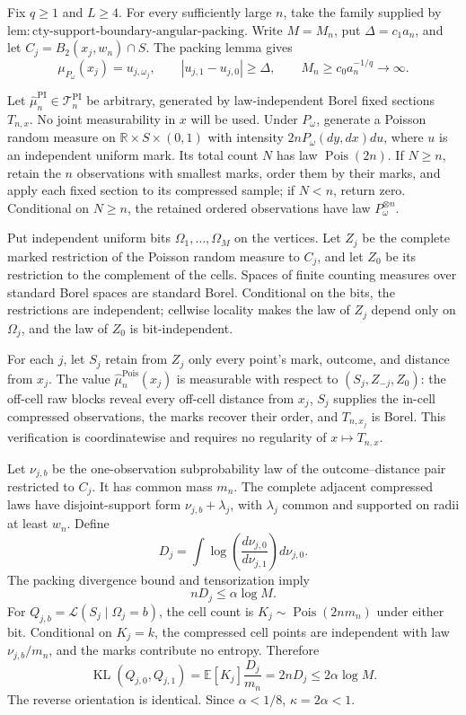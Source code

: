 Fix \(q\geq1\) and \(L\geq4\).  For every sufficiently large \(n\), take the family supplied by \(\mathrm{lem:cty\text{-}support\text{-}boundary\text{-}angular\text{-}packing}\).  Write \(M=M_n\), put \(\Delta=c_1a_n\), and let \(C_j=B_2(x_j,w_n)\cap S\).  The packing lemma gives
\[
 \mu_{P_\omega}(x_j)=u_{j,\omega_j},
 \qquad |u_{j,1}-u_{j,0}|\geq\Delta,
 \qquad M_n\geq c_0a_n^{-1/q}\longrightarrow\infty.
\]

Let \(\widehat\mu_n^{\mathrm{PI}}\in\mathcal T_n^{\mathrm{PI}}\) be arbitrary, generated by law-independent Borel fixed sections \(T_{n,x}\).  No joint measurability in \(x\) will be used.  Under \(P_\omega\), generate a Poisson random measure on \(\mathbb R\times S\times(0,1)\) with intensity \(2nP_\omega(dy,dx)du\), where \(u\) is an independent uniform mark.  Its total count \(N\) has law \(\operatorname{Pois}(2n)\).  If \(N\geq n\), retain the \(n\) observations with smallest marks, order them by their marks, and apply each fixed section to its compressed sample; if \(N<n\), return zero.  Conditional on \(N\geq n\), the retained ordered observations have law \(P_\omega^{\otimes n}\).

Put independent uniform bits \(\Omega_1,\ldots,\Omega_M\) on the vertices.  Let \(Z_j\) be the complete marked restriction of the Poisson random measure to \(C_j\), and let \(Z_0\) be its restriction to the complement of the cells.  Spaces of finite counting measures over standard Borel spaces are standard Borel.  Conditional on the bits, the restrictions are independent; cellwise locality makes the law of \(Z_j\) depend only on \(\Omega_j\), and the law of \(Z_0\) is bit-independent.

For each \(j\), let \(S_j\) retain from \(Z_j\) only every point's mark, outcome, and distance from \(x_j\).  The value \(\widehat\mu_n^{\mathrm{Pois}}(x_j)\) is measurable with respect to \((S_j,Z_{-j},Z_0)\): the off-cell raw blocks reveal every off-cell distance from \(x_j\), \(S_j\) supplies the in-cell compressed observations, the marks recover their order, and \(T_{n,x_j}\) is Borel.  This verification is coordinatewise and requires no regularity of \(x\mapsto T_{n,x}\).

Let \(\nu_{j,b}\) be the one-observation subprobability law of the outcome--distance pair restricted to \(C_j\).  It has common mass \(m_n\).  The complete adjacent compressed laws have disjoint-support form \(\nu_{j,b}+\lambda_j\), with \(\lambda_j\) common and supported on radii at least \(w_n\).  Define
\[
 D_j=\int\log\!\left(\frac{d\nu_{j,0}}{d\nu_{j,1}}\right)d\nu_{j,0}.
\]
The packing divergence bound and tensorization imply
\[
 nD_j\leq\alpha\log M.
\]
For \(Q_{j,b}=\mathcal L(S_j\mid\Omega_j=b)\), the cell count is \(K_j\sim\operatorname{Pois}(2nm_n)\) under either bit.  Conditional on \(K_j=k\), the compressed cell points are independent with law \(\nu_{j,b}/m_n\), and the marks contribute no entropy.  Therefore
\[
 \operatorname{KL}(Q_{j,0},Q_{j,1})
 =\mathbb E[K_j]\frac{D_j}{m_n}
 =2nD_j
 \leq2\alpha\log M.
\]
The reverse orientation is identical.  Since \(\alpha<1/8\), \(\kappa=2\alpha<1\).

